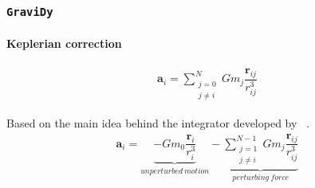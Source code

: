 
\begin{frame}[fragile]
    \frametitle{\texttt{GraviDy}}
    \framesubtitle{Keplerian correction}

    \begin{eqnarray}
        \boldsymbol{a}_{i} = \sum\limits_{\substack{j=0\\j\neq i}}^{N} G m_{j} \dfrac{\boldsymbol{r}_{ij}}{r_{ij}^{3}}
    \end{eqnarray}


    Based on the main idea behind the integrator developed by ~\cite{2006IAUJD...6E..24L}.
    \begin{eqnarray}
        \boldsymbol{a}_{i} =   \underbrace{ - G m_{0}
                                          \dfrac{\boldsymbol{r}_{i}}{r_{i}^{3}}
                                          }_{unperturbed\ motion}
                             - \underbrace{ \sum\limits_{\substack{j=1\\j\neq i}}^{N-1}
                                            G m_{j} \dfrac{\boldsymbol{r}_{ij}}{r_{ij}^{3}}
                                          }_{perturbing\ force}
    \end{eqnarray}
\end{frame}

